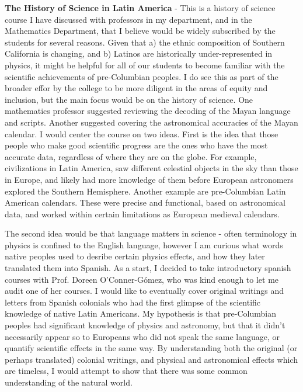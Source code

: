 \documentclass[../../main.tex]{subfiles}
\begin{document}
\textbf{The History of Science in Latin America} - This is a history of science course I have discussed with professors in my department, and in the Mathematics Department, that I believe would be widely subscribed by the students for several reasons.  Given that a) the ethnic composition of Southern California is changing, and b) Latinos are historically under-represented in physics, it might be helpful for all of our students to become familiar with the scientific achievements of pre-Columbian peoples.  I do see this as part of the broader effor by the college to be more diligent in the areas of equity and inclusion, but the main focus would be on the history of science.  One mathematics professor suggested reviewing the decoding of the Mayan language and scripts.  Another suggested covering the astronomical accuracies of the Mayan calendar.  I would center the course on two ideas. First is the idea that those people who make good scientific progress are the ones who have the most accurate data, regardless of where they are on the globe.  For example, civilizations in Latin America, saw different celestial objects in the sky than those in Europe, and likely had more knowledge of them before European astronomers explored the Southern Hemisphere.  Another example are pre-Columbian Latin American calendars.  These were precise and functional, based on astronomical data, and worked within certain limitations as European medieval calendars.  \\ \hspace{0.1cm}

The second idea would be that language matters in science - often terminology in physics is confined to the English language, however I am curious what words native peoples used to desribe certain physics effects, and how they later translated them into Spanish.  As a start, I decided to take introductory spanish courses with Prof. Doreen O'Conner-G\'{o}mez, who was kind enough to let me audit one of her courses.  I would like to eventually cover original writings and letters from Spanish colonials who had the first glimpse of the scientific knowledge of native Latin Americans.  My hypothesis is that pre-Columbian peoples had significant knowledge of physics and astronomy, but that it didn't necessarily appear so to Europeans who did not speak the same language, or quantify scientific effects in the same way.  By understanding both the original (or perhaps translated) colonial writings, and physical and astronomical effects which are timeless, I would attempt to show that there was some common understanding of the natural world. \\ \hspace{0.1cm}
\end{document}

